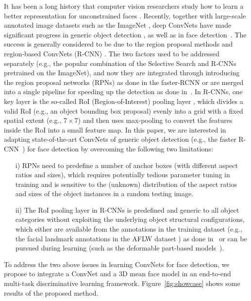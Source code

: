 \documentclass[runningheads]{llncs}
\begin{document}
It has been a long history that computer vision researchers study how to learn a better representation for unconstrained faces \cite{FaceDetSurvey,Face6Area,Face19Results}. Recently, together with large-scale annotated image datasets such as the ImageNet \cite{ImageNet}, deep ConvNets \cite{LeCunCNN,AlexNet} have made significant progress in  generic object detection \cite{FastRCNN,FasterRCNN,ResidualNet}, as well as in face detection~\cite{FaceCascadeCNN,DP2MFD}. The success is generally considered to be due to the region proposal methods and region-based ConvNets (R-CNN) \cite{RCNN}. The two factors used to be addressed separately (e.g., the popular combination of the Selective Search \cite{SS} and R-CNNs pretrained on the ImageNet), and now they are integrated through introducing the region proposal networks (RPNs) as done in the faster-RCNN \cite{FasterRCNN} or are merged into a single pipeline for speeding up the detection as done in~\cite{YOLO,liu15ssd}.  In R-CNNs, one key layer is the so-called RoI (Region-of-Interest) pooling layer \cite{FastRCNN}, which divides a valid RoI (e.g., an object bounding box proposal) evenly into a grid with a fixed spatial extent (e.g., $7\times 7$) and then uses max-pooling to convert the features inside the RoI into a small feature map. In this paper, we are interested in adapting state-of-the-art ConvNets of generic object detection (e.g., the faster R-CNN~\cite{FasterRCNN}) for face detection by overcoming the following two limitations:
\begin{enumerate}
\item[i)] RPNs need to predefine a number of anchor boxes (with different aspect ratios and sizes), which requires potentially tedious parameter tuning in training and is sensitive to the (unknown) distribution of the aspect ratios and sizes of the object instances in a random testing image.
\item[ii)] The RoI pooling layer in R-CNNs is predefined and generic to all object categories without exploiting the underlying object structural configurations, which either are available from the annotations in the training dataset (e.g., the facial landmark annotations in the AFLW dataset \cite{AFLW}) as done in~\cite{AFW} or can be pursued during learning (such as the deformable part-based models~\cite{DPM,DP2MFD}).
\end{enumerate}

To address the two above issues in learning ConvNets for face detection, we propose to integrate a ConvNet and a 3D mean face model in an end-to-end multi-task discriminative learning framework.
Figure~\ref{fig:showcase} shows some results of the proposed method.
\end{document}
